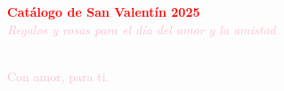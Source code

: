 \documentclass[12pt]{article}
\begin{document}
\begin{center}
    \Huge\textbf{\textcolor{red}{Catálogo de San Valentín 2025}} \\[0.5cm]
    \large\textit{\textcolor{pink}{Regalos y rosas para el día del amor y la amistad}} \\[1cm]
\end{center}



\vspace{1cm}
\begin{center}
    \\[0.5cm]
    \textcolor{pink}{\small Con amor, para ti.}
\end{center}
\end{document}
